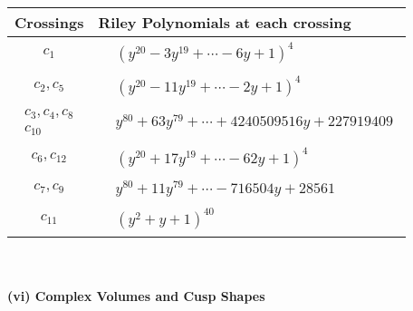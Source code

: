 \documentclass[1p]{elsarticle_modified}
\theoremstyle{definition}
\begin{document}
\begin{tabular}{m{50pt}|m{274pt}}
Crossings & \hspace{64pt}Riley Polynomials at each crossing \\
\hline $$\begin{aligned}c_{1}\end{aligned}$$&$\begin{aligned}
&(y^{20}-3 y^{19}+\cdots-6 y+1)^{4}
\end{aligned}$\\
\hline $$\begin{aligned}c_{2},c_{5}\end{aligned}$$&$\begin{aligned}
&(y^{20}-11 y^{19}+\cdots-2 y+1)^{4}
\end{aligned}$\\
\hline $$\begin{aligned}c_{3},c_{4},c_{8}\\c_{10}\end{aligned}$$&$\begin{aligned}
&y^{80}+63 y^{79}+\cdots+4240509516 y+227919409
\end{aligned}$\\
\hline $$\begin{aligned}c_{6},c_{12}\end{aligned}$$&$\begin{aligned}
&(y^{20}+17 y^{19}+\cdots-62 y+1)^{4}
\end{aligned}$\\
\hline $$\begin{aligned}c_{7},c_{9}\end{aligned}$$&$\begin{aligned}
&y^{80}+11 y^{79}+\cdots-716504 y+28561
\end{aligned}$\\
\hline $$\begin{aligned}c_{11}\end{aligned}$$&$\begin{aligned}
&(y^2+y+1)^{40}
\end{aligned}$\\
\hline
\end{tabular}\\~\\
\newpage\flushleft \textbf{(vi) Complex Volumes and Cusp Shapes}
\end{document}
